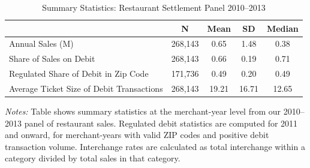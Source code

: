\documentclass[11pt,english]{article}
\theoremstyle{remark}
\begin{document}
\begin{table}[H]
\centering
\caption{Summary Statistics: Restaurant Settlement Panel 2010--2013}
\label{tab:durbin-summary}

{
\def\sym#1{\ifmmode^{#1}\else\(^{#1}\)\fi}
\begin{tabular}{l*{1}{cccc}}
\hline
                    &           N&        Mean&          SD&      Median\\
\hline
Annual Sales (M)    &     268,143&        0.65&        1.48&        0.38\\
Share of Sales on Debit&     268,143&        0.66&        0.19&        0.71\\
Regulated Share of Debit in Zip Code&     171,736&        0.49&        0.20&        0.49\\
Average Ticket Size of Debit Transactions&     268,143&       19.21&       16.71&       12.65\\
\hline
\end{tabular}
}
 
\par\textit{Notes:} Table shows summary statistics at the merchant-year level from our 2010--2013 panel of restaurant sales. Regulated debit statistics are computed for 2011 and onward, for merchant-years with valid ZIP codes and positive debit transaction volume. Interchange rates are calculated as total interchange within a category divided by total sales in that category.
\end{table}

\clearpage
\end{document}

